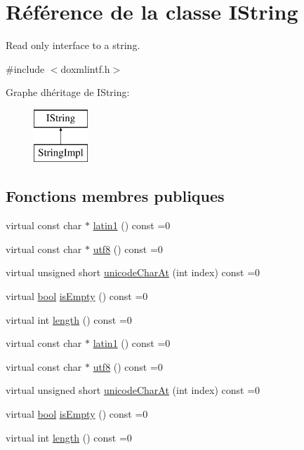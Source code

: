 \hypertarget{class_i_string}{}\section{Référence de la classe I\+String}
\label{class_i_string}


Read only interface to a string.  




{\ttfamily \#include $<$doxmlintf.\+h$>$}

Graphe d\textquotesingle{}héritage de I\+String\+:\begin{figure}[H]
\begin{center}
\leavevmode
\includegraphics[height=2.000000cm]{class_i_string}
\end{center}
\end{figure}
\subsection*{Fonctions membres publiques}
\begin{DoxyCompactItemize}
\item 
virtual const char $\ast$ \hyperlink{class_i_string_ad5e08ab1684c8a847c1f2e0ee6cda6e6}{latin1} () const  =0
\item 
virtual const char $\ast$ \hyperlink{class_i_string_a77d4677be705c727182c42d05f9a8b2f}{utf8} () const  =0
\item 
virtual unsigned short \hyperlink{class_i_string_a2109c19eb606978dc5abc3eb93ed6b48}{unicode\+Char\+At} (int index) const  =0
\item 
virtual \hyperlink{qglobal_8h_a1062901a7428fdd9c7f180f5e01ea056}{bool} \hyperlink{class_i_string_a87a427c65937147d123b320c7edafd89}{is\+Empty} () const  =0
\item 
virtual int \hyperlink{class_i_string_a148d90f59ecb084af1494313ea77f568}{length} () const  =0
\item 
virtual const char $\ast$ \hyperlink{class_i_string_ad5e08ab1684c8a847c1f2e0ee6cda6e6}{latin1} () const  =0
\item 
virtual const char $\ast$ \hyperlink{class_i_string_a77d4677be705c727182c42d05f9a8b2f}{utf8} () const  =0
\item 
virtual unsigned short \hyperlink{class_i_string_a2109c19eb606978dc5abc3eb93ed6b48}{unicode\+Char\+At} (int index) const  =0
\item 
virtual \hyperlink{qglobal_8h_a1062901a7428fdd9c7f180f5e01ea056}{bool} \hyperlink{class_i_string_a87a427c65937147d123b320c7edafd89}{is\+Empty} () const  =0
\item 
virtual int \hyperlink{class_i_string_a148d90f59ecb084af1494313ea77f568}{length} () const  =0
\end{DoxyCompactItemize}


